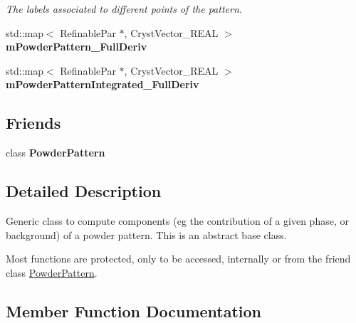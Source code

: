 \begin{DoxyCompactItemize}
\begin{DoxyCompactList}\small\item\em The labels associated to different points of the pattern. \end{DoxyCompactList}\item 
\mbox{\label{class_obj_cryst_1_1_powder_pattern_component_aa3d845e894c0aa662428be3073425c76}} 
std\+::map$<$ Refinable\+Par $\ast$, Cryst\+Vector\+\_\+\+R\+E\+AL $>$ {\bfseries m\+Powder\+Pattern\+\_\+\+Full\+Deriv}
\item 
\mbox{\label{class_obj_cryst_1_1_powder_pattern_component_aad606ec47f4cb4661f664bb19d6bf56c}} 
std\+::map$<$ Refinable\+Par $\ast$, Cryst\+Vector\+\_\+\+R\+E\+AL $>$ {\bfseries m\+Powder\+Pattern\+Integrated\+\_\+\+Full\+Deriv}
\end{DoxyCompactItemize}
\subsection*{Friends}
\begin{DoxyCompactItemize}
\item 
\mbox{\label{class_obj_cryst_1_1_powder_pattern_component_a7b7565a5c419f2d4753446ff094a44cb}} 
class {\bfseries Powder\+Pattern}
\end{DoxyCompactItemize}


\subsection{Detailed Description}
Generic class to compute components (eg the contribution of a given phase, or background) of a powder pattern. This is an abstract base class. 

Most functions are protected, only to be accessed, internally or from the friend class \mbox{\hyperlink{class_obj_cryst_1_1_powder_pattern}{Powder\+Pattern}}. 

\subsection{Member Function Documentation}
\mbox{\label{class_obj_cryst_1_1_powder_pattern_component_a8417ecb93009a9b7b9fccf074a9438d9}} 

